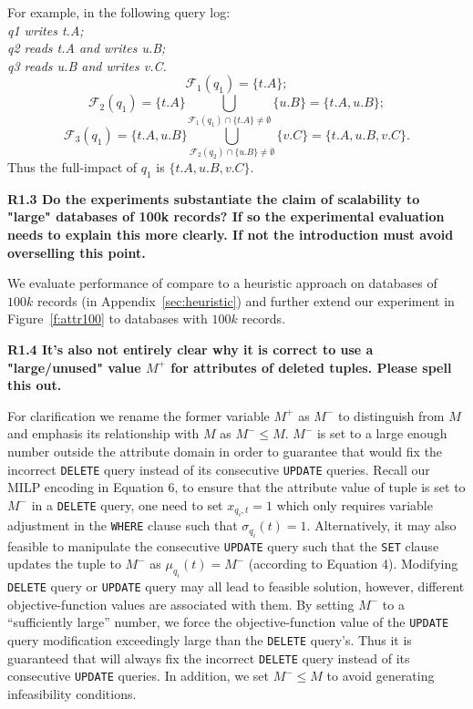 For example, in the following query log:\\
\textit{q1 writes t.A; \\
q2 reads t.A and writes u.B; \\
q3 reads u.B and writes v.C.}\\
\[\mathcal{F}_1(q_1) = \{t.A\};\] 
\[\mathcal{F}_2(q_1) = \{t.A\} \bigcup_{\mathcal{F}_1(q_1) \cap \{t.A\} \neq \emptyset} \{u.B\} = \{t.A, u.B\};\]
\[\mathcal{F}_3(q_1) = \{t.A, u.B\}\bigcup_{\mathcal{F}_2(q_2) \cap \{u.B\} \neq \emptyset} \{v.C\} = \{t.A, u.B, v.C\}.\]
Thus the full-impact of $q_1$ is $\{t.A, u.B, v.C\}$.

\noindent \textbf{R1.3 Do the experiments substantiate the claim of scalability to "large" databases of 100k records? If so the experimental evaluation needs to explain this more clearly. If not the introduction must avoid overselling this point.}

We evaluate performance of \sys compare to a heuristic approach on databases of $100k$ records (in Appendix~\ref{sec:heuristic}) and further extend our experiment in Figure~\ref{f:attr100} to databases with $100k$ records. 

\noindent \textbf{R1.4 It's also not entirely clear why it is correct to use a "large/unused" value $M^+$ for attributes of deleted tuples. Please spell this out.}

For clarification we rename the former variable $M^+$ as $M^-$ to distinguish from $M$ and emphasis its relationship with $M$ as $M^- \leq M$. 
$M^-$ is set to a large enough number outside the attribute domain in order to guarantee that \sys would fix the incorrect \texttt{DELETE} query instead of its consecutive \texttt{UPDATE} queries. Recall our MILP encoding in Equation 6, to ensure that the attribute value of tuple is set to $M^-$ in a \texttt{DELETE} query, one need to set $x_{q_i,t} = 1$ which only requires variable adjustment in the \texttt{WHERE} clause such that $\sigma_{q_i}(t) = 1$. Alternatively, it may also feasible to manipulate the consecutive \texttt{UPDATE} query such that the \texttt{SET} clause updates the tuple to $M^-$ as $\mu_{q_i}(t) = M^-$ (according to Equation 4). Modifying \texttt{DELETE} query or \texttt{UPDATE} query may all lead to feasible solution, however, different objective-function values are associated with them. By setting $M^-$ to a ``sufficiently large'' number, we force the objective-function value of the \texttt{UPDATE} query modification exceedingly large than the \texttt{DELETE} query's. Thus it is  guaranteed that \sys will always fix the incorrect \texttt{DELETE} query instead of its consecutive \texttt{UPDATE} queries. In addition, we set $M^- \leq M$ to avoid generating infeasibility conditions.

